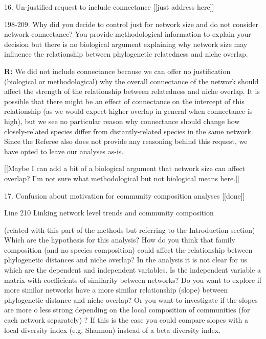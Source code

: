 \documentclass[12pt]{letter}
\newenvironment{refquote}{\bigskip \begin{it}}{\end{it}\smallskip}
\begin{document}
	16. Un-justified request to include connectance [[just address here]]

		\begin{refquote}
			198-209. Why did you decide to control just for network size and do not consider network connectance? You provide methodological information to explain your decision but there is no biological argument explaining why network size may influence the relationship between phylogenetic relatedness and niche overlap.
		\end{refquote}

		\textbf{R:} We did not include connectance because we can offer no justification (biological or methodological) why the overall connectance of the network should affect the strength of the relationship between relatedness and niche overlap. It is possible that there might be an effect of connectance on the intercept of this relationship (as we would expect higher overlap in general when connectance is high), but we see no particular reason why connectance should change how closely-related species differ from distantly-related species in the same network. Since the Referee also does not provide any reasoning behind this request, we have opted to leave our analyses as-is.


		[[Maybe I can add a bit of a biological argument that network size can affect overlap? I'm not sure what methodological but not biological means here.]]


	17. Confusion about motivation for community composition analyses [[done]]

		\begin{refquote}
			Line 210 Linking network level trends and community composition

			(related with this part of the methods but referring to the Introduction section) Which are the hypothesis for this analysis? How do you think that family composition (and no species composition) could affect the relationship between phylogenetic  distances and niche overlap?
			In the analysis it is not clear for us which are the dependent and independent variables. Is the independent variable a matrix with coefficients of similarity between networks?  Do you want to explore if more similar networks have a more similar relationship (slope) between phylogenetic distance and niche overlap? Or you want to investigate if the slopes are more o less strong depending on the local composition of communities (for each network separately) ? If this is the case you could compare slopes with a local diversity index (e.g. Shannon) instead of a beta diversity index.
		\end{refquote}
\end{document}
